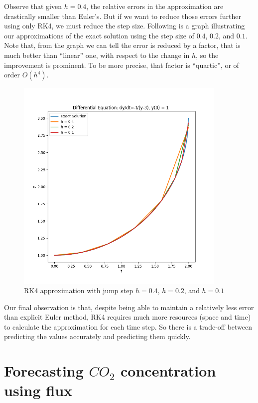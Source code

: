 \documentclass[a4paper]{article}
\begin{document}
Observe that given \(h = 0.4\), the relative errors in the approximation are drastically smaller than Euler's. But if we want to reduce those errors further using only RK4, we must reduce the step size. Following is a graph illustrating our approximations of the exact solution using the step size of \(0.4\), \(0.2\), and \(0.1\). Note that, from the graph we can tell the error is reduced by a factor, that is much better than ``linear'' one, with respect to the change in \(h\), so the improvement is prominent. To be more precise, that factor is ``quartic'', or of order \(O(h^4)\).

\begin{figure}[H]
  \centering
  \includegraphics[width=0.9\textwidth]{plot_runge_kutta.png}
  \caption{RK4 approximation with jump step \(h = 0.4\), \(h = 0.2\), and \(h = 0.1\)}
\end{figure}

Our final observation is that, despite being able to maintain a relatively less error than explicit Euler method, RK4 requires much more resources (space and time) to calculate the approximation for each time step. So there is a trade-off between predicting the values accurately and predicting them quickly.

\newpage
\section{Forecasting \texorpdfstring{\(CO_2\)}{} concentration using flux}
\end{document}

